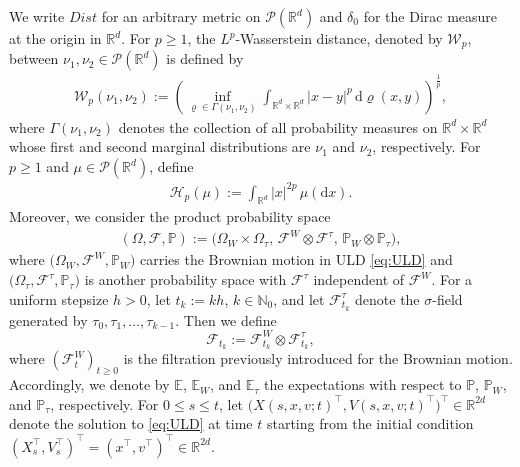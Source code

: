 \documentclass[12pt]{article}
\numberwithin{equation}{section}
\begin{document}
We write $\textit{Dist}$ for an arbitrary metric on $\mathcal P(\mathbb R^{d})$
and $\delta_0$ for the Dirac measure at the origin in $\mathbb R^{d}$.
For $ p \geq 1$, the $L^p$-Wasserstein distance, denoted by $\mathcal{W}_p$, between
$\nu_1,\nu_2\in\mathcal{P}(\mathbb{R}^{d})$ is defined by
\begin{align}
    \mathcal W_{p}(\nu_1,\nu_2)
    :=
    \left(
    \inf_{\varrho \in \Gamma(\nu_1,\nu_2)}
    \int_{\mathbb R^{d}\times \mathbb R^{d}}
    |x-y|^{ p}\,\mathrm d\varrho(x,y)
    \right)^{\frac{1}{p}},
\end{align}
where $\Gamma(\nu_1,\nu_2)$ denotes the collection of all probability measures
on $\mathbb R^{d} \times \mathbb R^{d}$ whose first and second marginal
distributions are $\nu_1$ and $\nu_2$, respectively.
For $p\ge 1$ and $\mu\in\mathcal P(\mathbb R^d)$, define
\begin{align}
    \mathcal H_p(\mu)
    :=
    \int_{\mathbb R^d}|x|^{2p}\,\mu(\mathrm dx).
\end{align}
Moreover, we consider the product probability space
\begin{align}
\label{def: pps}
(\Omega,\mathcal{F},\mathbb{P})
:=
\big(\Omega_W \times \Omega_\tau,\,
\mathcal{F}^W \otimes \mathcal{F}^\tau,\,
\mathbb{P}_W \otimes \mathbb{P}_\tau \big),
\end{align}
where $\big(\Omega_W,\mathcal{F}^W,\mathbb{P}_W\big)$ carries the Brownian motion in ULD \eqref{eq:ULD} and $\big(\Omega_\tau,\mathcal{F}^\tau,\mathbb{P}_\tau\big)$ is another probability space with $\mathcal{F}^\tau$
independent of $\mathcal{F}^W$.
%
For a uniform stepsize \(h>0\), let \(t_k:=kh\), \(k\in\mathbb N_0\), and let \(\mathcal F_{t_k}^\tau\) denote the $\sigma$-field generated by \(\tau_0,\tau_1,\ldots,\tau_{k-1}\). Then we define
$$
\mathcal F_{t_k}
:=
\mathcal F_{t_k}^W\otimes\mathcal F_{t_k}^\tau,
$$
where \((\mathcal F_t^W)_{t\geq0}\) is the filtration previously introduced for the Brownian motion.
%
Accordingly, we denote by $\mathbb{E}$, $\mathbb{E}_W$, and $\mathbb{E}_\tau$ the expectations with respect to $\mathbb{P}$, $\mathbb{P}_W$, and $\mathbb{P}_\tau$, respectively.
For \(0\leq s\leq t\), let
\(
\big(
X(s,x,v;t)^\top,
V(s,x,v;t)^\top
\big)^\top
\in\mathbb R^{2d}
\)
denote the solution to \eqref{eq:ULD} at time \(t\) starting from the initial condition
\(
(
X_s^\top,
V_s^\top
)^\top
=
(
x^\top,
v^\top
)^\top
\in\mathbb R^{2d}.
\)
\end{document}
